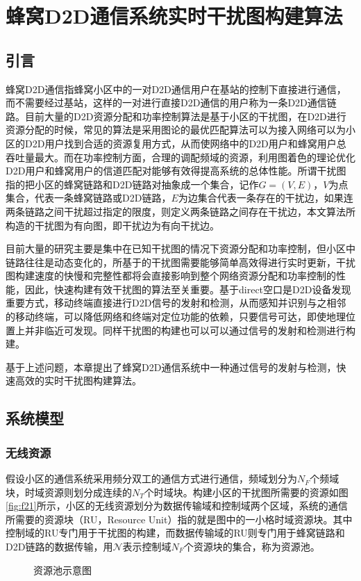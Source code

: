 \documentclass[figurelist,tablelist,algorithmlist,nomlist,masters]{seuthesix}
\begin{document}
	\chapter{蜂窝D2D通信系统实时干扰图构建算法}
	\section{引言}
	蜂窝D2D通信指蜂窝小区中的一对D2D通信用户在基站的控制下直接进行通信，而不需要经过基站，这样的一对进行直接D2D通信的用户称为一条D2D通信链路。目前大量的D2D资源分配和功率控制算法是基于小区的干扰图，在D2D进行资源分配的时候，常见的算法是采用图论的最优匹配算法可以为接入网络可以为小区的D2D用户找到合适的资源复用方式，从而使网络中的D2D用户和蜂窝用户总吞吐量最大。而在功率控制方面，合理的调配频域的资源，利用图着色的理论优化D2D用户和蜂窝用户的信道匹配对能够有效得提高系统的总体性能。所谓干扰图指的把小区的蜂窝链路和D2D链路对抽象成一个集合，记作$G=(V,E)$，$V$为点集合，代表一条蜂窝链路或D2D链路，$E$为边集合代表一条存在的干扰边，如果连两条链路之间干扰超过指定的限度，则定义两条链路之间存在干扰边，本文算法所构造的干扰图为有向图，即干扰边为有向干扰边。
	
	目前大量的研究主要是集中在已知干扰图的情况下资源分配和功率控制，但小区中链路往往是动态变化的，所基于的干扰图需要能够简单高效得进行实时更新，干扰图构建速度的快慢和完整性都将会直接影响到整个网络资源分配和功率控制的性能，因此，快速构建有效干扰图的算法至关重要。基于direct空口是D2D设备发现重要方式，移动终端直接进行D2D信号的发射和检测，从而感知并识别与之相邻的移动终端，可以降低网络和终端对定位功能的依赖，只要信号可达，即使地理位置上并非临近可发现。同样干扰图的构建也可以可以通过信号的发射和检测进行构建。
	
	基于上述问题，本章提出了蜂窝D2D通信系统中一种通过信号的发射与检测，快速高效的实时干扰图构建算法。
	
	\section{系统模型}
	\subsection{无线资源}
	假设小区的通信系统采用频分双工的通信方式进行通信，频域划分为$N_{F}$个频域块，时域资源则划分成连续的$N_{T}$个时域块。构建小区的干扰图所需要的资源如图\ref{fig:f21}所示，小区的无线资源划分为数据传输域和控制域两个区域，系统的通信所需要的资源块（RU，Resource Unit）指的就是图中的一小格时域资源块。其中控制域的RU专门用于干扰图的构建，而数据传输域的RU则专门用于蜂窝链路和D2D链路的数据传输，用$\mathcal{N}$表示控制域$N_{F}$个资源块的集合，称为资源池。
	\begin{figure}[htb]
		\centering
		\caption{资源池示意图}\label{f21}
	\end{figure}
	
\end{document}
